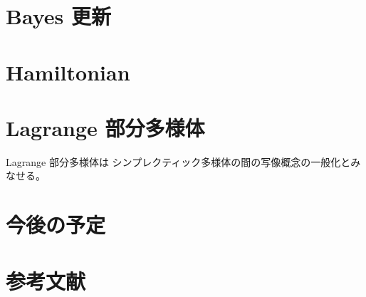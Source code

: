 \documentclass[report]{jlreq}
\begin{document}
%
\section{Bayes 更新}

\begin{proposition}
    \TODO{}
\end{proposition}

%
\section{Hamiltonian}

\begin{definition}
    \TODO{}
\end{definition}

\begin{definition}[Hamiltonian]
    \TODO{}
\end{definition}

%
\section{Lagrange 部分多様体}

\begin{definition}
    \TODO{}
\end{definition}

Lagrange 部分多様体は
シンプレクティック多様体の間の写像概念の一般化とみなせる。

\begin{definition}[Lagrange 対応]
    \TODO{}
\end{definition}

%
\section*{今後の予定}

%
\section*{参考文献}

%
\end{document}
